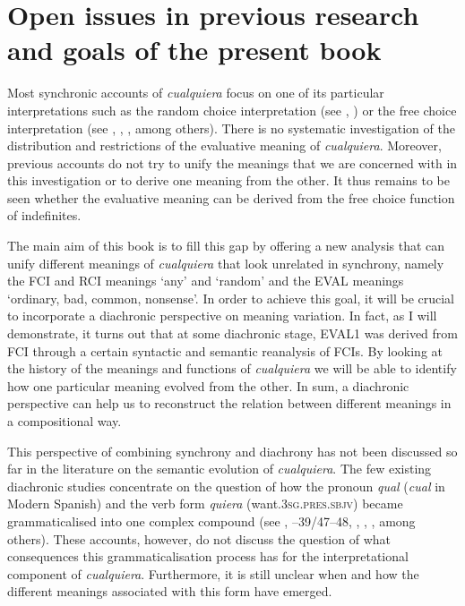 \section{Open issues in previous research and goals of the present book} \label{sec:1.4}

Most synchronic accounts of \textit{cualquiera} focus on one of its particular interpretations such as the random choice interpretation (see \citealt{ChoiRomero2008}, \citealt{Alonso-OvalleMenéndez-Benito2011}) or the free choice interpretation (see \citealt{Menéndez-Benito2010}, \citealt{AloniPort2013}, \citealt{Fălăuş2015}, among others). There is no systematic investigation of the distribution and restrictions of the evaluative meaning of \textit{cualquiera}. Moreover, previous accounts do not try to unify the meanings that we are concerned with in this investigation or to derive one meaning from the other. It thus remains to be seen whether the evaluative meaning can be derived from the free choice function of indefinites.

The main aim of this book is to fill this gap by offering a new analysis that can unify different meanings of \textit{cualquiera} that look unrelated in synchrony, namely the FCI and RCI meanings ‘any’ and ‘random’ and the EVAL meanings ‘ordinary, bad, common, nonsense’. In order to achieve this goal, it will be crucial to incorporate a diachronic perspective on meaning variation. In fact, as I will demonstrate, it turns out that at some diachronic stage, EVAL1 was derived from FCI through a certain syntactic and semantic reanalysis of FCIs. By looking at the history of the meanings and functions of \textit{cualquiera} we will be able to identify how one particular meaning evolved from the other. In sum, a diachronic perspective can help us to reconstruct the relation between different meanings in a compositional way.

This perspective of combining synchrony and diachrony has not been discussed so far in the literature on the semantic evolution of \textit{cualquiera}. The few existing diachronic studies concentrate on the question of how the pronoun \textit{qual} (\textit{cual} in Modern Spanish) and the verb form \textit{quiera} (want.\textsc{3sg.pres.sbjv}) became grammaticalised into one complex compound (see \citealt{Palomo1934}, \citealt{Lombard1938}–39/47–48, \citealt{Rivero1988}, \citealt{Company-CompanyPozas-Loyo2009}, \citealt{Mackenzie2019}, among others). These accounts, however, do not discuss the question of what consequences this grammaticalisation process has for the interpretational component of \textit{cualquiera}. Furthermore, it is still unclear when and how the different meanings associated with this form have emerged.

